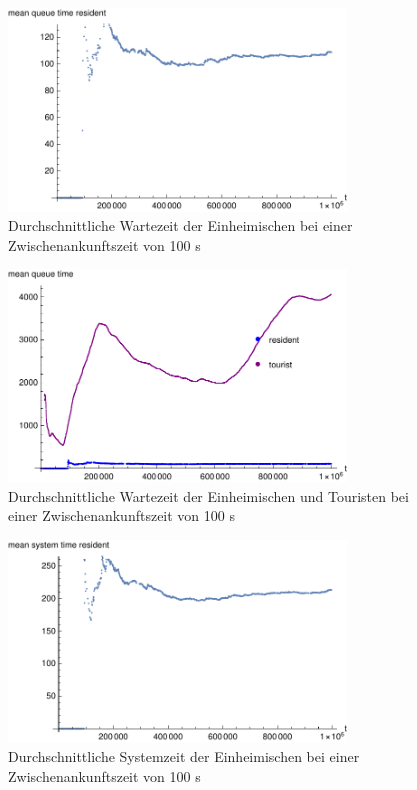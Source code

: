 \begin{figure}[htpb]
	\centering
	\includegraphics[width=0.8\textwidth]{abbildungen/1_Phone_VIP/Arrival_100_Serve_100_dur_1000000_Skip_0/MeanQueueTimeResident.pdf}
	\caption{Durchschnittliche Wartezeit der Einheimischen bei einer Zwischenankunftszeit von 100 s}
	\label{fig:1_Phone_VIP_100_MeanQueueTime_Resident}
\end{figure} 

\begin{figure}[htpb]
	\centering
	\includegraphics[width=0.8\textwidth]{abbildungen/1_Phone_VIP/Arrival_100_Serve_100_dur_1000000_Skip_0/MeanQueueTimeTouristAndResident.pdf}
	\caption{Durchschnittliche Wartezeit der Einheimischen und Touristen bei einer Zwischenankunftszeit von 100 s}
	\label{fig:1_Phone_VIP_100_MeanQueueTime_All}
\end{figure} 


\begin{figure}[htpb]
	\centering
	\includegraphics[width=0.8\textwidth]{abbildungen/1_Phone_VIP/Arrival_100_Serve_100_dur_1000000_Skip_0/MeanSystemTimeResident.pdf}
	\caption{Durchschnittliche Systemzeit der Einheimischen bei einer Zwischenankunftszeit von 100 s}
	\label{fig:1_Phone_VIP_100_MeanSystemTime_Resident}
\end{figure} 

